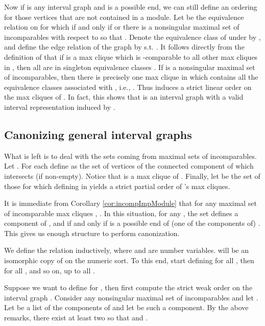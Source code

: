 \documentclass[10pt]{article}
\theoremstyle{remark}
\theoremstyle{definition}
\theoremstyle{plain}
\begin{document}
Now if  is any interval graph and  is a possible end, we can still define an ordering for those vertices that are not contained in a module. Let  be the equivalence relation on  for which  if and only if  or there is a nonsingular maximal set of incomparables  with respect to  so that . Denote the equivalence class of  under  by , and define the edge relation  of the graph  by  s.t. . It follows directly from the definition of  that if  is a max clique which is -comparable to all other max cliques in , then all  are in singleton equivalence classes . If  is a nonsingular maximal set of incomparables, then there is precisely one max clique  in  which contains all the equivalence classes associated with , i.e., . Thus  induces a strict linear order on the max cliques of . In fact, this shows that  is an interval graph with a valid interval representation induced by . 










\subsection{Canonizing general interval graphs} \label{subsec:generalIntGraphs}
What is left is to deal with the sets  coming from maximal sets of incomparables. Let . For each  define  as the set of vertices of the connected component of  which intersects  (if non-empty). Notice that  is a max clique of . Finally, let  be the set of those  for which defining  in  yields a strict partial order of 's max cliques.

It is immediate from Corollary \ref{cor:incompImpModule} that for any maximal set of incomparable max cliques , . In this situation, for any , the set  defines a component of , and  if and only if  is a possible end of (one of the components of) . This gives us enough structure to perform canonization.





 We define the relation  inductively, where  and  are number variables.  will be an isomorphic copy of  on the numeric sort. To this end, start defining  for all , then for all , and so on, up to all .

Suppose we want to define  for , then first compute the strict weak order  on the interval graph . Consider any nonsingular maximal set of incomparables  and let . Let  be a list of the components of  and let  be such a component. By the above remarks, there exist at least two  so that  and .
\end{document}
